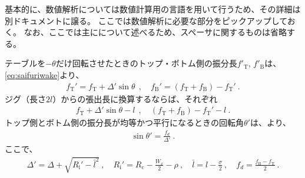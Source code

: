 




基本的に、数値解析については数値計算用の言語を用いて行うため、その詳細は別ドキュメントに譲る。
ここでは数値解析に必要な部分をピックアップしておく。
なお、ここでは主に\DMname について述べるため、スペーサに関するものは省略する。


テーブルを$-\theta$だけ回転させたときのトップ・ボトム側の振分長$f'_\mathrm T$, $f'_\mathrm B$は、\eqref{eq:saifuriwake}より、
\begin{align*}
  f_\mathrm T' = f_\mathrm T+\varDelta'\!\sin\theta~~, \quad
  f_\mathrm B' = (f_\mathrm T+f_\mathrm B)-f_\mathrm T'\ .
\end{align*}
ジグ（長さ$2l$）からの張出長に換算するならば、それぞれ
\begin{align*}
  f_\mathrm T+\varDelta'\!\sin\theta-l~~, \quad
  (f_\mathrm T+f_\mathrm B)-f_\mathrm T'-l\ .
\end{align*}
トップ側とボトム側の振分長が均等かつ平行になるときの回転角$\theta'$は、より、
\begin{align*}
  \sin\theta' = \frac{f_d}{\varDelta'}\ .
\end{align*}
ここで、
\begin{align*}
  \varDelta' = \varDelta+\sqrt{R_\mathrm i'-\bar l^2}\ , \quad
  R_\mathrm i' = R_\mathrm c-\frac{W_x}2-\rho\ ,\quad
  \bar l = l-\frac\sigma2\ ,\quad
  f_d = \frac{f_\mathrm B-f_\mathrm T}2\ .
\end{align*}



